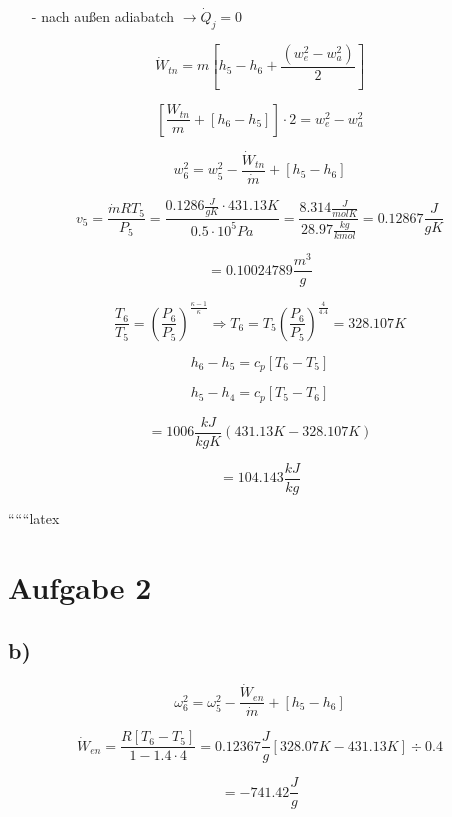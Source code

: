 \begin{itemize}
    \item[-] nach außen adiabatch $\rightarrow \dot{Q}_j = 0$
\end{itemize}

\[
\dot{W}_{tn} = m \left[ h_5 - h_6 + \frac{(w_e^2 - w_a^2)}{2} \right]
\]

\[
\left[ \frac{W_{tn}}{m} + \left[ h_6 - h_5 \right] \right] \cdot 2 = w_e^2 - w_a^2
\]

\[
w_6^2 = w_5^2 - \frac{\dot{W}_{tn}}{\dot{m}} + \left[ h_5 - h_6 \right]
\]

\[
v_5 = \frac{\dot{m} RT_5}{P_5} = \frac{0.1286 \frac{J}{gK} \cdot 431.13K}{0.5 \cdot 10^5 Pa} = \frac{8.314 \frac{J}{molK}}{28.97 \frac{kg}{kmol}} = 0.12867 \frac{J}{gK}
\]

\[
= 0.10024789 \frac{m^3}{g}
\]

\[
\frac{T_6}{T_5} = \left( \frac{P_6}{P_5} \right)^{\frac{\kappa - 1}{\kappa}} \Rightarrow T_6 = T_5 \left( \frac{P_6}{P_5} \right)^{\frac{4}{4.4}} = 328.107 K
\]

\[
h_6 - h_5 = c_p \left[ T_6 - T_5 \right]
\]

\[
h_5 - h_4 = c_p \left[ T_5 - T_6 \right]
\]

\[
= 1006 \frac{kJ}{kgK} \left( 431.13K - 328.107K \right)
\]

\[
= 104.143 \frac{kJ}{kg}
\]

``````latex


\section*{Aufgabe 2}

\subsection*{b)}

\begin{equation*}
    \omega_6^2 = \omega_5^2 - \frac{\dot{W}_{en}}{\dot{m}} + \left[ h_5 - h_6 \right]
\end{equation*}

\begin{equation*}
    \dot{W}_{en} = \frac{R \left[ T_6 - T_5 \right]}{1 - 1.4 \cdot 4} = 0.12367 \frac{J}{g} \left[ 328.07 K - 431.13 K \right] \div 0.4
\end{equation*}

\begin{equation*}
    = -741.42 \frac{J}{g}
\end{equation*}

